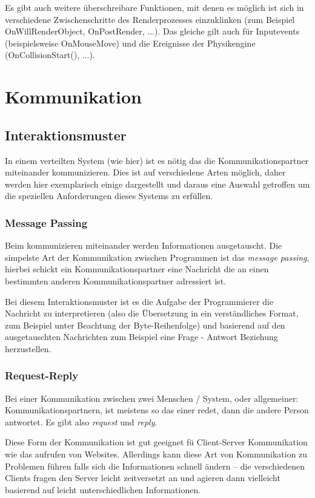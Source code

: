 Es gibt auch weitere {\"{u}}berschreibare Funktionen, mit denen es m{\"{o}}glich ist sich in verschiedene Zwischenschritte des Renderprozesses
einzuklinken (zum Beispiel OnWillRenderObject, OnPostRender, ...). Das gleiche gilt auch f{\"{u}}r Inputevents (beispielsweise OnMouseMove) und
die Ereignisse der Physikengine (OnCollisionStart(), ...).

\clearpage
\section{Kommunikation}

\subsection{Interaktionsmuster}
In einem verteilten System (wie hier) ist es n{\"{o}}tig das die Kommunikationspartner miteinander kommunizieren.
Dies ist auf verschiedene Arten m{\"{o}}glich, daher werden hier exemplarisch einige dargestellt und daraus eine
Auswahl getroffen um die speziellen Anforderungen dieses Systems zu erf{\"{u}}llen.

\subsubsection{Message Passing}
Beim kommunizieren miteinander werden Informationen ausgetauscht. Die simpelste Art der Kommunikation zwischen
Programmen ist das \textit{message passing}, hierbei schickt ein Kommunikationspartner eine Nachricht die an einen bestimmten anderen
Kommunikationspartner adressiert ist.

Bei diesem Interaktionsmuster ist es die Aufgabe der Programmierer die Nachricht zu interpretieren
(also die {\"{U}}bersetzung in ein verst{\"{a}}ndliches Format, zum Beispiel unter Beachtung der Byte-Reihenfolge) und
basierend auf den ausgetauschten Nachrichten zum Beispiel eine Frage - Antwort Beziehung herzustellen.


\subsubsection{Request-Reply}
Bei einer Kommunikation zwischen zwei Menschen / System, oder allgemeiner: Kommunikationspartnern,
ist meistens so das einer redet, dann die andere Person antwortet. Es gibt also \textit{request}
und \textit{reply}.

Diese Form der Kommunikation ist gut geeignet f{\"{u}} Client-Server Kommunikation wie das
aufrufen von Websites. Allerdings kann diese Art von Kommunikation zu Problemen f{\"{u}}hren falls sich die
Informationen schnell {\"{a}}ndern -- die verschiedenen Clients fragen den Server leicht zeitversetzt an und
agieren dann vielleicht basierend auf leicht unterschiedlichen Informationen.

